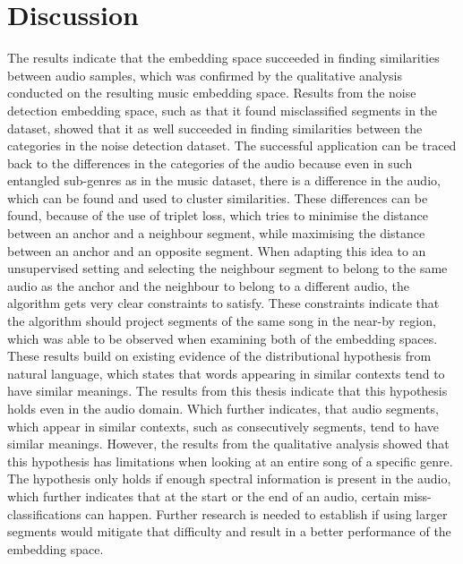 \section{Discussion}
\label{sec:Discussion}
The results indicate that the embedding space succeeded in finding similarities between audio samples, which was confirmed by the qualitative analysis conducted on the resulting music embedding space. Results from the noise detection embedding space, such as that it found misclassified segments in the dataset, showed that it as well succeeded in finding similarities between the categories in the noise detection dataset. The successful application can be traced back to the differences in the categories of the audio because even in such entangled sub-genres as in the music dataset, there is a difference in the audio, which can be found and used to cluster similarities. These differences can be found, because of the use of triplet loss, which tries to minimise the distance between an anchor and a neighbour segment, while maximising the distance between an anchor and an opposite segment. When adapting this idea to an unsupervised setting and selecting the neighbour segment to belong to the same audio as the anchor and the neighbour to belong to a different audio, the algorithm gets very clear constraints to satisfy. These constraints indicate that the algorithm should project segments of the same song in the near-by region, which was able to be observed when examining both of the embedding spaces.
\newline
\newline
These results build on existing evidence of the distributional hypothesis from natural language, which states that words appearing in similar contexts tend to have similar meanings. The results from this thesis indicate that this hypothesis holds even in the audio domain. Which further indicates, that audio segments, which appear in similar contexts, such as consecutively segments, tend to have similar meanings. However, the results from the qualitative analysis showed that this hypothesis has limitations when looking at an entire song of a specific genre. The hypothesis only holds if enough spectral information is present in the audio, which further indicates that at the start or the end of an audio, certain miss-classifications can happen. Further research is needed to establish if using larger segments would mitigate that difficulty and result in a better performance of the embedding space. 

